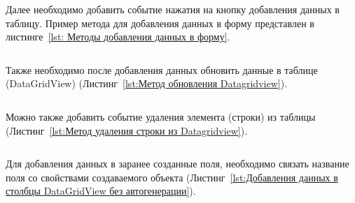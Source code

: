 \documentclass[12pt]{article}
\newcommand{\colorGIT}[1]{\textcolor{CtpLavender}{#1}}
\renewcommand{\texttt}[1]{{\small\ttfamily #1}}
\newenvironment{code}{\captionsetup{type=listing}}{}
\numberwithin{listing}{section}
\numberwithin{figure}{section}
\begin{document}
Далее необходимо добавить событие нажатия на кнопку добавления данных в таблицу. Пример метода для добавления данных в форму представлен в листинге~\ref{lst: Методы добавления данных в форму}.

\begin{code}
	\inputminted[firstline = 165, lastline=200]{csharp}{../../2lab/WinFormsApp1example_/Form1.cs}
	\caption{\colorGIT{\href{https://github.com/WebMasterIT/Csharp_Labs/blob/c79e983c4cab3c416e44b6d5f9854b292fdeae26/2lab/WinFormsApp1example_/Form1.cs\#L165-L200}{Метод}} добавления данных в форму}
	\label{lst: Методы добавления данных в форму}
\end{code}

Также необходимо после добавления данных обновить данные в таблице (\texttt{DataGridView}) (Листинг~\ref{lst:Метод обновления Datagridview}).

\begin{code}
	\inputminted[firstline = 234, lastline=277]{csharp}{../../2lab/WinFormsApp1example_/Form1.cs}
	\caption{\colorGIT{\href{https://github.com/WebMasterIT/Csharp_Labs/blob/c79e983c4cab3c416e44b6d5f9854b292fdeae26/2lab/WinFormsApp1example_/Form1.cs\#L234-L277}{Метод}} обновления \texttt{DataGridView}}
	\label{lst:Метод обновления Datagridview}
\end{code}


Можно также добавить событие удаления элемента (строки) из таблицы (Листинг~\ref{lst:Метод удаления строки из Datagridview}).

\begin{code}
	\inputminted[firstline = 346, lastline=363]{csharp}{../../2lab/WinFormsApp1example_/Form1.cs}
	\caption{\colorGIT{\href{https://github.com/WebMasterIT/Csharp_Labs/blob/c79e983c4cab3c416e44b6d5f9854b292fdeae26/2lab/WinFormsApp1example_/Form1.cs\#L346-L363}{Метод}} удаления строки из \texttt{DataGridView}}
	\label{lst:Метод удаления строки из Datagridview}
\end{code}

Для добавления данных в заранее созданные поля, необходимо связать название поля со свойствами создаваемого объекта (Листинг~\ref{lst:Добавления данных в столбцы DataGridView без автогенерации}).

\begin{code}
	\inputminted[firstline=146, lastline=163]{csharp}{../../2lab/WinFormsApp1example_/Form1.cs}
	\caption{\colorGIT{\href{https://github.com/WebMasterIT/Csharp_Labs/blob/c79e983c4cab3c416e44b6d5f9854b292fdeae26/2lab/WinFormsApp1example_/Form1.cs\#L146-L163}{Добавление}} данных в столбцы \texttt{DataGridView} без автогенерации}
	\label{lst:Добавления данных в столбцы DataGridView без автогенерации}
\end{code}
\end{document}
